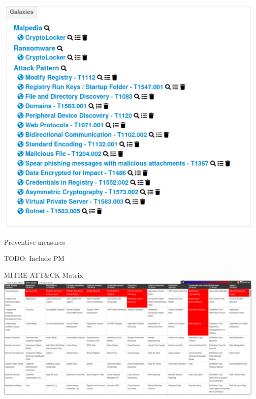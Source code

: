 \begin{frame}
    \begin{center}
        \includegraphics[width=0.80\linewidth]{pictures/case2/event-clusters.png}
    \end{center}
\end{frame}

\begin{frame}
    Preventive measures
    \begin{center}
        TODO: Include PM
    \end{center}
\end{frame}

\begin{frame}
    MITRE ATT\&CK Matrix\\

    \vspace{6pt}
    \includegraphics[width=1.0\linewidth]{pictures/case2/event-attack.png}
\end{frame}

